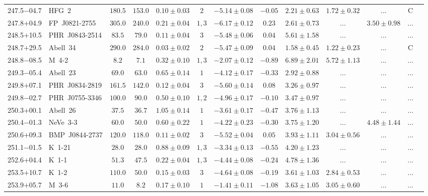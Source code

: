 \documentclass[useAMS]{mn2e}
\begin{document}
\begin{center}
{\begin{longtable}{llccccccccccc}
247.5$-$04.7&HFG~2&$     180.5$&$     153.0$&$0.10 \pm 0.03$&$2$&$-5.14 \pm 0.08$&$     -0.05$&$2.21 \pm 0.63$&$1.72 \pm 0.32$&$...$&C\\
247.8$+$04.9&FP~J0821-2755&$     305.0$&$     240.0$&$0.21 \pm 0.04$&$1,3$&$-6.17 \pm 0.12$&$      0.23$&$2.61 \pm 0.73$&$...$&$3.50 \pm 0.98$&...\\
248.5$+$10.5&PHR~J0843-2514&$      83.5$&$      79.0$&$0.11 \pm 0.04$&$3$&$-5.48 \pm 0.06$&$      0.04$&$5.61 \pm 1.58$&$...$&$...$&...\\
248.7$+$29.5&Abell~34&$     290.0$&$     284.0$&$0.03 \pm 0.02$&$2$&$-5.47 \pm 0.09$&$      0.04$&$1.58 \pm 0.45$&$1.22 \pm 0.23$&$...$&C\\
248.8$-$08.5&M~4-2&$       8.2$&$       7.1$&$0.32 \pm 0.10$&$1,3$&$-2.07 \pm 0.12$&$     -0.89$&$6.89 \pm 2.01$&$5.72 \pm 1.13$&$...$&...\\
249.3$-$05.4&Abell~23&$      69.0$&$      63.0$&$0.65 \pm 0.14$&$1$&$-4.12 \pm 0.17$&$     -0.33$&$2.92 \pm 0.88$&$...$&$...$&...\\
249.8$+$07.1&PHR~J0834-2819&$     161.5$&$     142.0$&$0.12 \pm 0.04$&$3$&$-5.60 \pm 0.14$&$      0.08$&$3.26 \pm 0.97$&$...$&$...$&...\\
249.8$-$02.7&PHR~J0755-3346&$     100.0$&$      90.0$&$0.50 \pm 0.10$&$1,2$&$-4.96 \pm 0.17$&$     -0.10$&$3.47 \pm 0.97$&$...$&$...$&...\\
250.3$+$00.1&Abell~26&$      37.5$&$      36.7$&$1.05 \pm 0.14$&$1$&$-3.61 \pm 0.17$&$     -0.47$&$3.76 \pm 1.13$&$...$&$...$&...\\
250.4$-$01.3&NeVe~3-3&$      60.0$&$      50.0$&$0.60 \pm 0.22$&$1$&$-4.22 \pm 0.23$&$     -0.30$&$3.75 \pm 1.20$&$...$&$4.48 \pm 1.44$&...\\
250.6$+$09.3&BMP~J0844-2737&$     120.0$&$     118.0$&$0.11 \pm 0.02$&$3$&$-5.52 \pm 0.04$&$      0.05$&$3.93 \pm 1.11$&$3.04 \pm 0.56$&$...$&...\\
251.1$-$01.5&K~1-21&$      28.0$&$      28.0$&$0.88 \pm 0.09$&$1,3$&$-3.34 \pm 0.13$&$     -0.55$&$4.20 \pm 1.23$&$...$&$...$&...\\
252.6$+$04.4&K~1-1&$      51.3$&$      47.5$&$0.22 \pm 0.04$&$1,3$&$-4.44 \pm 0.08$&$     -0.24$&$4.78 \pm 1.36$&$...$&$...$&...\\
253.5$+$10.7&K~1-2&$     110.0$&$      50.0$&$0.15 \pm 0.03$&$3$&$-4.64 \pm 0.08$&$     -0.19$&$3.61 \pm 1.03$&$2.84 \pm 0.53$&$...$&...\\
253.9$+$05.7&M~3-6&$      11.0$&$       8.2$&$0.17 \pm 0.10$&$1$&$-1.41 \pm 0.11$&$     -1.08$&$3.63 \pm 1.05$&$3.05 \pm 0.60$&$...$&...\\

\end{longtable}}
\end{center}
\end{document}
